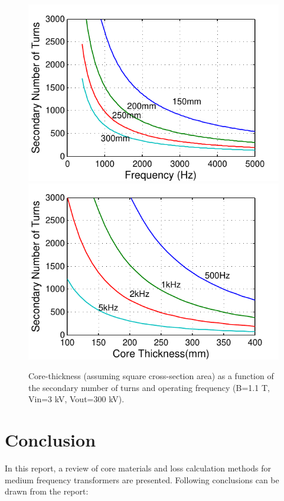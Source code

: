\documentclass[a4paper, 11pt]{article} %
\begin{document}
\begin{figure}[]
  \centering
    \includegraphics[]{secondary_Nturns_core}
    \includegraphics[]{secondary_Nturns_freq}
   \caption{Core-thickness (assuming square cross-section area) as a function of the secondary number of turns and operating frequency (B=1.1 T, Vin=3 kV, Vout=300 kV).}
  \label{secondary_core_dimensions}
\end{figure}


\section{Conclusion}

In this report, a review of core materials and loss calculation methods for medium frequency transformers are presented. Following conclusions can be drawn from the report:
\end{document}
